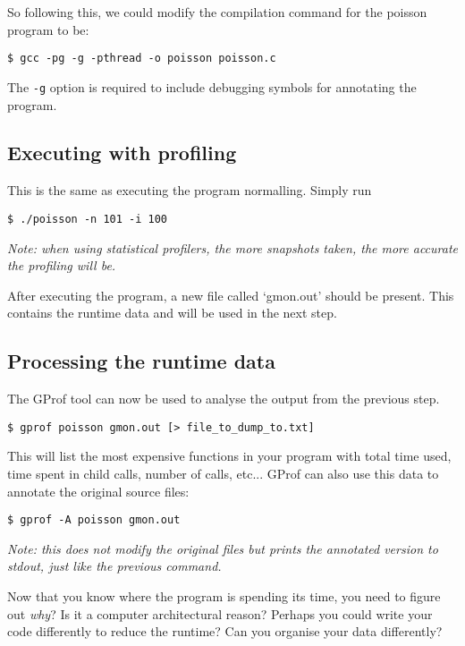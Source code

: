 \documentclass[a4paper,11pt]{article}
\begin{document}
So following this, we could modify the compilation command for the poisson
program to be:
%
\begin{verbatim}
$ gcc -pg -g -pthread -o poisson poisson.c
\end{verbatim}
%
The \texttt{-g} option is required to include debugging symbols for annotating the program.


\subsection{Executing with profiling}

This is the same as executing the program normalling. Simply run
\begin{verbatim}
$ ./poisson -n 101 -i 100
\end{verbatim}

\emph{Note: when using statistical profilers, the more snapshots taken, the more
accurate the profiling will be.}

After executing the program, a new file called `gmon.out' should be present.
This contains the runtime data and will be used in the next step.

\subsection{Processing the runtime data}

The GProf tool can now be used to analyse the output from the previous step.

\begin{verbatim}
$ gprof poisson gmon.out [> file_to_dump_to.txt]
\end{verbatim}

This will list the most expensive functions in your program with total time
used, time spent in child calls, number of calls, etc... GProf can also use this
data to annotate the original source files:

\begin{verbatim}
$ gprof -A poisson gmon.out
\end{verbatim}

\emph{Note: this does not modify the original files but prints the annotated
version to stdout, just like the previous command.}

Now that you know where the program is spending its time, you need to figure out
\emph{why}? Is it a computer architectural reason? Perhaps you could write your
code differently to reduce the runtime? Can you organise your data differently?
\end{document}
